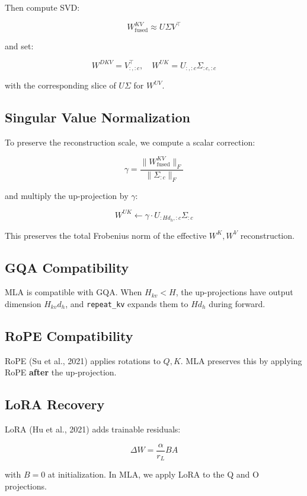 Then compute SVD:

\[
W^{KV}_\text{fused} \approx U \Sigma V^\top
\tag{3.7}
\]

and set:

\[
W^{DKV} = V_{:, :c}^\top, \quad
W^{UK} = U_{:, :c} \Sigma_{:c, :c}
\tag{3.8}
\]

with the corresponding slice of $U \Sigma$ for $W^{UV}$.

\subsection{Singular Value Normalization}

To preserve the reconstruction scale, we compute a scalar correction:

\[
\gamma = \frac{\|W^{KV}_\text{fused}\|_F}{\|\Sigma_{:c}\|_F}
\tag{3.9}
\]

and multiply the up-projection by $\gamma$:

\[
W^{UK} \leftarrow \gamma \cdot U_{:H d_h, :c} \Sigma_{:c}
\tag{3.10}
\]

This preserves the total Frobenius norm of the effective $W^K, W^V$ 
reconstruction.

\subsection{GQA Compatibility}

MLA is compatible with GQA. When $H_{kv} < H$, the up-projections have 
output dimension $H_{kv} d_h$, and \texttt{repeat\_kv} expands them to $H d_h$ 
during forward.

\subsection{RoPE Compatibility}

RoPE (Su et al., 2021) applies rotations to $Q, K$. MLA preserves this by 
applying RoPE \textbf{after} the up-projection.

\subsection{LoRA Recovery}

LoRA (Hu et al., 2021) adds trainable residuals:

\[
\Delta W = \frac{\alpha}{r_L} B A
\tag{3.11}
\]

with $B = 0$ at initialization. In MLA, we apply LoRA to the Q and O 
projections.


